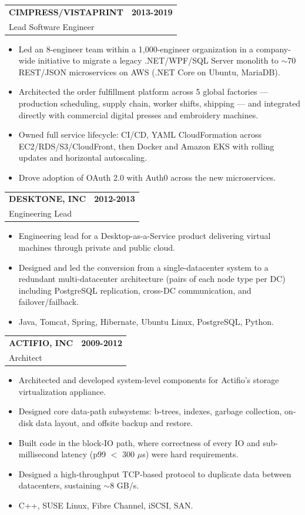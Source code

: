 \documentclass[11pt]{article}
\makeatletter
\newcommand{\jobheading}[4]{%
  \vspace{4pt}\begin{tabularx}{\textwidth}{@{}X r@{}}
    {\textbf{#1}} & {\textbf{#2}} \\
    {{\normalsize #3}\hspace{0.5em}{\color{muted}·}\hspace{0.5em}{\color{muted}#4}} & {} \\
  \end{tabularx}\vspace{0pt}
}
\makeatother
\begin{document}
\jobheading{CIMPRESS/VISTAPRINT}{2013-2019}{Lead Software Engineer}{Waltham, MA}
\begin{itemize}
\item Led an 8-engineer team within a 1,000-engineer organization in a company-wide initiative to migrate a legacy .NET/WPF/SQL Server monolith to $\sim$70 REST/JSON microservices on AWS (.NET Core on Ubuntu, MariaDB).
\item Architected the order fulfillment platform across 5 global factories --- production scheduling, supply chain, worker shifts, shipping --- and integrated directly with commercial digital presses and embroidery machines.
\item Owned full service lifecycle: CI/CD, YAML CloudFormation across EC2/RDS/S3/CloudFront, then Docker and Amazon EKS with rolling updates and horizontal autoscaling.
\item Drove adoption of OAuth 2.0 with Auth0 across the new microservices.
\end{itemize}

\jobheading{DESKTONE, INC}{2012-2013}{Engineering Lead}{Lexington, MA}
\begin{itemize}
\item Engineering lead for a Desktop-as-a-Service product delivering virtual machines through private and public cloud.
\item Designed and led the conversion from a single-datacenter system to a redundant multi-datacenter architecture (pairs of each node type per DC) including PostgreSQL replication, cross-DC communication, and failover/failback.
\item Java, Tomcat, Spring, Hibernate, Ubuntu Linux, PostgreSQL, Python.
\end{itemize}

\jobheading{ACTIFIO, INC}{2009-2012}{Architect}{Waltham, MA}
\begin{itemize}
\item Architected and developed system-level components for Actifio's storage virtualization appliance.
\item Designed core data-path subsystems: b-trees, indexes, garbage collection, on-disk data layout, and offsite backup and restore.
\item Built code in the block-IO path, where correctness of every IO and sub-millisecond latency (p99 $<$ 300 $\mu$s) were hard requirements.
\item Designed a high-throughput TCP-based protocol to duplicate data between datacenters, sustaining $\sim$8 GB/s.
\item C++, SUSE Linux, Fibre Channel, iSCSI, SAN.
\end{itemize}
\end{document}
